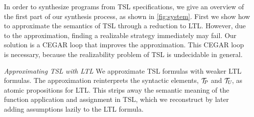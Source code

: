 In order to synthesize programs from TSL specifications, we give an overview of the first part of our synthesis process, as shown in \cref{fig:system}.
First we show how to approximate the semantics of TSL through a reduction to LTL.
However, due to the approximation, finding a realizable strategy immediately may fail.
Our solution is a CEGAR loop that improves the approximation.
This CEGAR loop is necessary, because the realizability problem of TSL is undecidable in general.

\medskip

\noindent \textit{Approximating TSL with LTL} We approximate TSL
formulas with weaker LTL formulas.  The approximation reinterprets the
syntactic elements, $\mathcal{T}_{\!P\hspace{-0.5pt}}$ and $\mathcal{T}_{\hspace{-0.5pt}U \!}$, as atomic propositions
for LTL. This strips away the semantic meaning of the function
application and assignment in TSL, which we reconstruct by later
adding assumptions lazily to the LTL formula.

